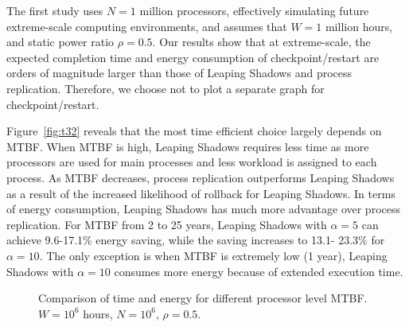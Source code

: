 The first study uses $N=1$ million processors, effectively simulating future extreme-scale computing environments, and assumes that $W=1$ million hours, and static power ratio $\rho=0.5$. 
Our results show that at extreme-scale, the expected completion time and energy consumption of checkpoint/restart are orders of magnitude larger than those of Leaping Shadows and process replication. Therefore, we choose not to plot a separate graph for checkpoint/restart. 

Figure~\ref{fig:t32} reveals that the most time efficient choice largely depends on MTBF. 
When MTBF is high, Leaping Shadows requires less time as more processors are used for main processes and less workload is assigned to each process. As MTBF decreases, process replication outperforms Leaping Shadows as a result of the increased likelihood of rollback for Leaping Shadows. 
In terms of energy consumption, Leaping Shadows has much more advantage over process replication. For MTBF from 2 to 25 years, Leaping Shadows with $\alpha=5$ can achieve 9.6-17.1\% energy saving, while the saving increases to 13.1- 23.3\% for $\alpha=10$. The only exception is when MTBF is extremely low (1 year), Leaping Shadows with $\alpha=10$ consumes more energy because of extended execution time.

\begin{figure}[!h]
	\begin{center}

		\caption{Comparison of time and energy for different processor level MTBF. $W=10^6$ hours, $N=10^6$, $\rho=0.5$.}
	\end{center}
	\label{fig:com3}
\end{figure}




